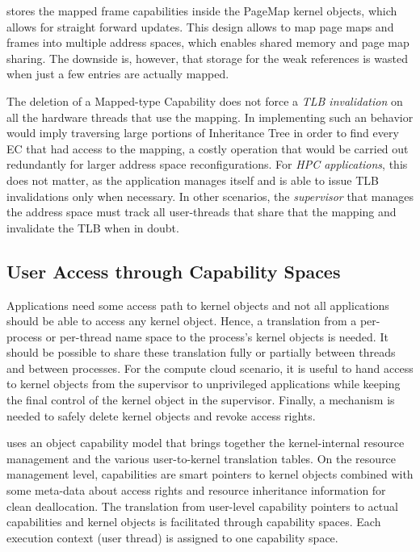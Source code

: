 \mythos stores the mapped frame capabilities inside the PageMap kernel objects, which allows for straight forward updates. This design allows to map page maps and frames into multiple address spaces, which enables shared memory and page map sharing. The downside is, however, that storage for the weak references is wasted when just a few entries are actually mapped.

The deletion of a Mapped-type Capability does not force a \emph{TLB invalidation} on all the hardware threads that use the mapping. In implementing such an behavior would imply traversing large portions of Inheritance Tree in order to find every EC that had access to the mapping, a costly operation that would be carried out redundantly for larger address space reconfigurations.
For \emph{HPC applications}, this does not matter, as the application manages itself and is able to issue TLB invalidations only when necessary.
In other scenarios, the \emph{supervisor} that manages the address space must track all user-threads that share that the mapping and invalidate the TLB when in doubt.

\subsection{User Access through Capability Spaces}
\label{sec:log:capability-spaces}

Applications need some access path to kernel objects and not all applications should be able to access any kernel object. Hence, a translation from a per-process or per-thread name space to the process's kernel objects is needed. It should be possible to share these translation fully or partially between threads and between processes. For the compute cloud scenario, it is useful to hand access to kernel objects from the supervisor to unprivileged applications while keeping the final control of the kernel object in the supervisor. Finally, a mechanism is needed to safely delete kernel objects and revoke access rights.

\mythos uses an object capability model that brings together the kernel-internal resource management and the various user-to-kernel translation tables. On the resource management level, capabilities are smart pointers to kernel objects combined with some meta-data about access rights and resource inheritance information for clean deallocation. The translation from user-level capability pointers to actual capabilities and kernel objects is facilitated through capability spaces. Each execution context (user thread) is assigned to one capability space. 

